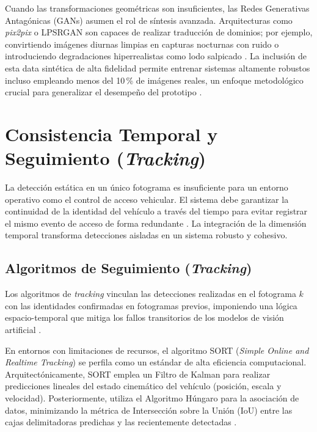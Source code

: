 Cuando las transformaciones geométricas son insuficientes, las Redes Generativas 
Antagónicas (GANs) asumen el rol de síntesis avanzada. Arquitecturas como \textit{pix2pix} o 
LPSRGAN son capaces de realizar traducción de dominios; por ejemplo, convirtiendo imágenes 
diurnas limpias en capturas nocturnas con ruido o introduciendo degradaciones hiperrealistas 
como lodo salpicado \parencite{larocaAdvancingMultinationalLicense2025, xuDeepLearningAlgorithms2026c}. 
La inclusión de esta data sintética de alta fidelidad permite entrenar sistemas altamente 
robustos incluso empleando menos del 10\,\% de imágenes reales, un enfoque metodológico 
crucial para generalizar el desempeño del prototipo 
\parencite{larocaAdvancingMultinationalLicense2025}.


\section{Consistencia Temporal y Seguimiento (\textit{Tracking})}

La detección estática en un único fotograma es insuficiente para un entorno operativo 
como el control de acceso vehicular. El sistema debe garantizar la continuidad de la 
identidad del vehículo a través del tiempo para evitar registrar el mismo evento de 
acceso de forma redundante \parencite{ammarMultiStageDeepLearningBasedVehicle2023, mobeenRealTimeAutomaticLicense2026}. 
La integración de la dimensión temporal transforma detecciones aisladas en un sistema 
robusto y cohesivo.

\subsection{Algoritmos de Seguimiento (\textit{Tracking})}

Los algoritmos de \textit{tracking} vinculan las detecciones realizadas en el fotograma 
$k$ con las identidades confirmadas en fotogramas previos, imponiendo una lógica 
espacio-temporal que mitiga los fallos transitorios de los modelos de visión artificial 
\parencite{mobeenRealTimeAutomaticLicense2026}.

En entornos con limitaciones de recursos, el algoritmo SORT (\textit{Simple Online and Realtime Tracking}) 
se perfila como un estándar de alta eficiencia computacional. Arquitectónicamente, SORT emplea un 
Filtro de Kalman para realizar predicciones lineales del estado cinemático del vehículo 
(posición, escala y velocidad). Posteriormente, utiliza el Algoritmo Húngaro para la 
asociación de datos, minimizando la métrica de Intersección sobre la Unión (IoU) entre 
las cajas delimitadoras predichas y las recientemente detectadas 
\parencite{mobeenRealTimeAutomaticLicense2026}.

